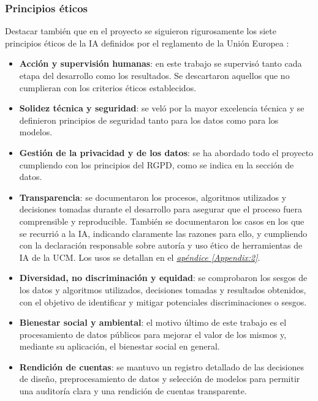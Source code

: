 \subsubsection{Principios éticos} \label{sec:Metodos_Principios_EU}

Destacar también que en el proyecto se siguieron rigurosamente los siete principios éticos de la IA definidos por el reglamento de la Unión Europea \citep{webRIA2024Europa, omnibus2026Europa}:

\begin{itemize}
	\item \textbf{Acción y supervisión humanas}: en este trabajo se supervisó tanto cada etapa del desarrollo como los resultados. Se descartaron aquellos que no cumplieran con los criterios éticos establecidos.
	
	\item \textbf{Solidez técnica y seguridad}: se veló por la mayor excelencia técnica y se definieron principios de seguridad tanto para los datos como para los modelos.
	
	\item \textbf{Gestión de la privacidad y de los datos}: se ha abordado todo el proyecto cumpliendo con los principios del RGPD, como se indica en la sección de datos.
	
	\item \textbf{Transparencia}: se documentaron los procesos, algoritmos utilizados y decisiones tomadas durante el desarrollo para asegurar que el proceso fuera comprensible y reproducible. También se documentaron los casos en los que se recurrió a la IA, indicando claramente las razones para ello, y cumpliendo con la declaración responsable sobre autoría y uso ético de herramientas de IA de la UCM. Los usos se detallan en el
	\hyperref[Appendix:2]{\textit{apéndice \ref*{Appendix:2}}}.
	
	\item \textbf{Diversidad, no discriminación y equidad}: se comprobaron los sesgos de los datos y algoritmos utilizados, decisiones tomadas y resultados obtenidos, con el objetivo de identificar y mitigar potenciales discriminaciones o sesgos.
	
	\item \textbf{Bienestar social y ambiental}: el motivo último de este trabajo es el procesamiento de datos públicos para mejorar el valor de los mismos y, mediante su aplicación, el bienestar social en general.
	
	\item \textbf{Rendición de cuentas}: se mantuvo un registro detallado de las decisiones de diseño, preprocesamiento de datos y selección de modelos para permitir una auditoría clara y una rendición de cuentas transparente.
\end{itemize}


